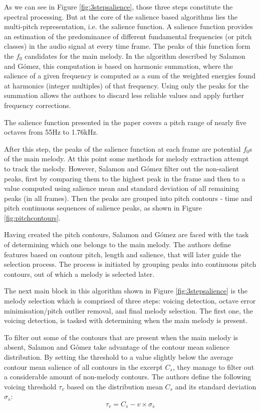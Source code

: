 As we can see in Figure \ref{fig:3stepsalience}, those three steps constitute the spectral processing. But at the core of the salience based algorithms lies the multi-pitch representation, i.e. the salience function. A salience function provides an estimation of the predominance of different fundamental frequencies (or pitch classes) in the audio signal at every time frame. The peaks of this function form the $f_{0}$ candidates for the main melody. In the algorithm described by Salamon and G\'{o}mez, this computation is based on harmonic summation, where the salience of  a given frequency is computed as a sum of the weighted energies found at harmonics (integer multiples) of that frequency. Using only the peaks for the summation allows the authors to discard less reliable values and apply further frequency corrections. 

The salience function presented in the paper covers a pitch range of nearly five octaves from 55Hz to 1.76kHz.

After this step, the peaks of the salience function at each frame are potential $f_{0}$s of the main melody. At this point some methods for melody extraction attempt to track the melody. However, Salamon and G\'{o}mez filter out the non-salient peaks, first by comparing them to the highest peak in the frame and then to a value computed using salience mean and standard deviation of all remaining peaks (in all frames). Then the peaks are grouped into pitch contours - time and pitch continuous sequences of salience peaks, as shown in Figure \ref{fig:pitchcontours}.

Having created the pitch contours, Salamon and G\'{o}mez are faced with the task of determining which one belongs to the main melody. The authors define features based on contour pitch, length and salience, that will later guide the selection process. The process is initiated by grouping peaks into continuous pitch contours, out of which a melody is selected later. 

The next main block in this algorithm shown in Figure \ref{fig:3stepsalience} is the melody selection which is comprised of three steps: voicing detection, octave error minimisation/pitch outlier removal, and final melody selection. The first one, the voicing detection, is tasked with determining when the main melody is present. 

To filter out some of the contours that are present when the main melody is absent, Salamon and G\'{o}mez take advantage of the contour mean salience distribution. By setting the threshold to a value slightly below the average contour mean salience of all contours in the excerpt $C_{s}$, they manage to filter out a considerable amount of non-melody contours. The authors define the following voicing threshold $\tau_{v}$ based on the distribution mean $C_{s}$ and its standard deviation $\sigma_{\overline{s}}$:
\begin{equation}
\tau_{v} = C_{s} - v \times \sigma_{\overline{s}}
\end{equation}

